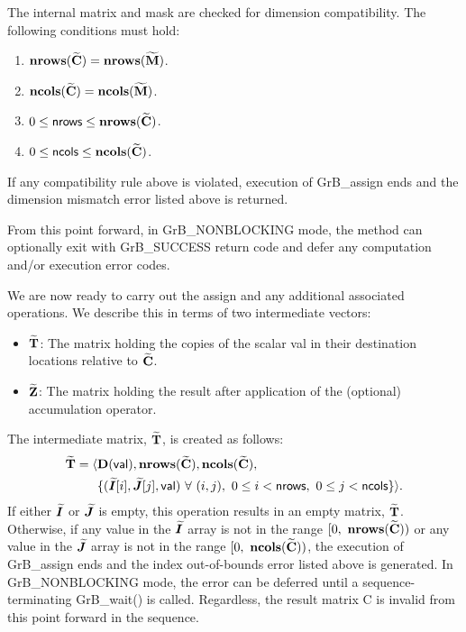 The internal matrix and mask are checked for dimension compatibility. 
The following conditions must hold:
\begin{enumerate}
    \item $\bold{nrows}({\bf \widetilde{C}}) = \bold{nrows}({\bf \widetilde{M}})$.

    \item $\bold{ncols}({\bf \widetilde{C}}) = \bold{ncols}({\bf \widetilde{M}})$.

    \item $0 \leq {\sf nrows} \leq \bold{nrows}({\bf \widetilde{C}})$.

    \item $0 \leq {\sf ncols} \leq \bold{ncols}({\bf \widetilde{C}})$.
\end{enumerate}
If any compatibility rule above is violated, execution of {\sf GrB\_assign} ends and 
the dimension mismatch error listed above is returned.

From this point forward, in {\sf GrB\_NONBLOCKING} mode, the method can 
optionally exit with {\sf GrB\_SUCCESS} return code and defer any computation 
and/or execution error codes.

We are now ready to carry out the assign and any additional 
associated operations.  We describe this in terms of two intermediate vectors:
\begin{itemize}
	\item ${\bf \widetilde{T}}$: The matrix holding the copies of the scalar 
    {\sf val} in their destination locations relative to 
    ${\bf \widetilde{C}}$.
    
	\item ${\bf \widetilde{Z}}$: The matrix holding the result after 
    application of the (optional) accumulation operator.
\end{itemize}

The intermediate matrix, ${\bf \widetilde{T}}$, is created as follows:
\[
\begin{aligned}
{\bf \widetilde{T}} = \langle & \bold{D}({\sf val}),
                           \bold{nrows}({\bf \widetilde{C}}), 
                           \bold{ncols}({\bf \widetilde{C}}), \\
 & \{ (\bm{\widetilde{I}}[i],\bm{\widetilde{J}}[j], {\sf val}) 
 \ \forall \ (i,j), \ 0 \leq i < {\sf nrows}, \ 0 \leq j < {\sf ncols} \} \rangle. 
\end{aligned}
\]
If either $\bm{\widetilde{I}}$ or $\bm{\widetilde{J}}$ is empty, this 
operation results in an empty matrix, ${\bf \widetilde{T}}$.  Otherwise, if 
any value in the $\bm{\widetilde{I}}$ array is not in
the range $[0,\ \bold{nrows}(\matrix{\widetilde{C}}) )$ or any value in the 
$\bm{\widetilde{J}}$ array is not in the range 
$[0,\ \bold{ncols}(\matrix{\widetilde{C}}))$, the execution of {\sf GrB\_assign} 
ends and the index out-of-bounds error listed above is generated. In 
{\sf GrB\_NONBLOCKING} mode, the error can be deferred until a 
sequence-terminating {\sf GrB\_wait()} is called.  Regardless, the result 
matrix {\sf C} is invalid from this point forward in the sequence.

